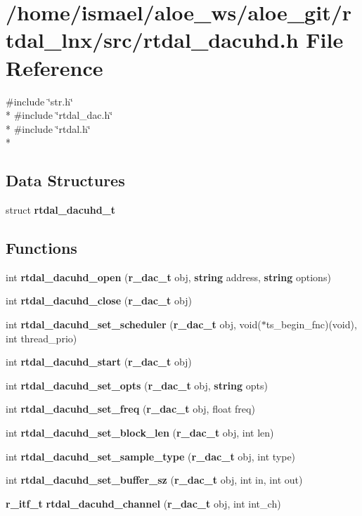 \section{/home/ismael/aloe\-\_\-ws/aloe\-\_\-git/rtdal\-\_\-lnx/src/rtdal\-\_\-dacuhd.h File Reference}
\label{rtdal__dacuhd_8h}
{\ttfamily \#include \char`\"{}str.\-h\char`\"{}}\\*
{\ttfamily \#include \char`\"{}rtdal\-\_\-dac.\-h\char`\"{}}\\*
{\ttfamily \#include \char`\"{}rtdal.\-h\char`\"{}}\\*
\subsection*{Data Structures}
\begin{DoxyCompactItemize}
\item 
struct {\bf rtdal\-\_\-dacuhd\-\_\-t}
\end{DoxyCompactItemize}
\subsection*{Functions}
\begin{DoxyCompactItemize}
\item 
int {\bf rtdal\-\_\-dacuhd\-\_\-open} ({\bf r\-\_\-dac\-\_\-t} obj, {\bf string} address, {\bf string} options)
\item 
int {\bf rtdal\-\_\-dacuhd\-\_\-close} ({\bf r\-\_\-dac\-\_\-t} obj)
\item 
int {\bf rtdal\-\_\-dacuhd\-\_\-set\-\_\-scheduler} ({\bf r\-\_\-dac\-\_\-t} obj, void($\ast$ts\-\_\-begin\-\_\-fnc)(void), int thread\-\_\-prio)
\item 
int {\bf rtdal\-\_\-dacuhd\-\_\-start} ({\bf r\-\_\-dac\-\_\-t} obj)
\item 
int {\bf rtdal\-\_\-dacuhd\-\_\-set\-\_\-opts} ({\bf r\-\_\-dac\-\_\-t} obj, {\bf string} opts)
\item 
int {\bf rtdal\-\_\-dacuhd\-\_\-set\-\_\-freq} ({\bf r\-\_\-dac\-\_\-t} obj, float freq)
\item 
int {\bf rtdal\-\_\-dacuhd\-\_\-set\-\_\-block\-\_\-len} ({\bf r\-\_\-dac\-\_\-t} obj, int len)
\item 
int {\bf rtdal\-\_\-dacuhd\-\_\-set\-\_\-sample\-\_\-type} ({\bf r\-\_\-dac\-\_\-t} obj, int type)
\item 
int {\bf rtdal\-\_\-dacuhd\-\_\-set\-\_\-buffer\-\_\-sz} ({\bf r\-\_\-dac\-\_\-t} obj, int in, int out)
\item 
{\bf r\-\_\-itf\-\_\-t} {\bf rtdal\-\_\-dacuhd\-\_\-channel} ({\bf r\-\_\-dac\-\_\-t} obj, int int\-\_\-ch)
\end{DoxyCompactItemize}


